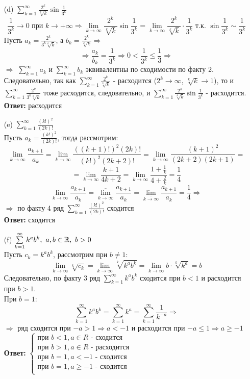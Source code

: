 \documentclass[a4paper]{article}
\renewcommand{\f}[2]{\frac{#1}{#2}}
\newcommand{\s}[2]{\sum\limits_{#1}^{#2}}
\newcommand{\case}[1]{\begin{cases} #1 \end{cases}}
\newcommand{\ts}{\text{\space}}
\renewcommand{\r}{\Rightarrow}
\renewcommand{\geq}{\geqslant}
\renewcommand{\leq}{\leqslant}
\newcommand{\RR}{\mathbb{R}}
\begin{document}
\begin{enumerate}
\begin{enumerate}
        \item[(d)]
        $\s{k=1}{\infty}\f{2^k}{\sqrt[k]{k}}\sin{\f{1}{3^k}}$
        $$\f{1}{3^k} \to 0 \text{ при } k \to +\infty \r \lim_{k\to \infty}\f{2^k}{\sqrt[k]{k}}\sin{\f{1}{3^k}} = \lim_{k\to \infty}\f{2^k}{\sqrt[k]{k}} \cdot  \f{1}{3^k} \text{ т.к. } \sin{\f{1}{3^k}} \sim \f{1}{3^k}  $$
        Пусть $a_k = \f{2^k}{3^k \sqrt[k]{k}}$, а $b_k = \f{2^k}{\sqrt[k]{k}} \r $
        $$\r \f{a_k}{b_k} = \f{1}{3^k}\r 0 <\f{1}{3^k} \leq \f{1}{3} \r $$
        $\r$ $\s{k=1}{\infty}a_k$ и  $\s{k=1}{\infty}b_k$ эквивалентны по сходимости по факту 2.\\
        Следовательно, так как $\s{k=1}{\infty}\f{2^k}{\sqrt[k]{k}}$ - расходится ($2^k \to \infty$, $\sqrt[k]{k} \to 1$), то и $\s{k=1}{\infty}\f{2^k}{3^k \sqrt[k]{k}}$ тоже расходится,
        следовательно, и  $\s{k=1}{\infty}\f{2^k}{\sqrt[k]{k}}\sin{\f{1}{3^k}}$ - расходится.\\
        \textbf{Ответ: } расходится\\

        \item[(e)]$\s{k=1}{\infty}\f{(k!)^2}{(2k)!}$\\
        Пусть $a_k = \f{(k!)^2}{(2k)!}$, тогда рассмотрим:
        $$\lim_{k \to \infty}\f{a_{k+1}}{a_k} = \lim_{k \to \infty}\f{((k+1)!)^2 (2k)!}{(k!)^2 (2k+2)!} = \lim_{k \to \infty}\f{(k+1)^2}{(2k+2)(2k+1)} = $$ 
        $$= \lim_{k \to \infty}\f{k+1}{4k+2} = \lim_{k \to \infty}\f{1+\f{1}{k}}{4+\f{2}{k}} = \f{1}{4}$$
        $$\lim_{k \to \infty}\f{a_{k+1}}{a_k} = \overline{\lim_{k \to \infty}}\f{a_{k+1}}{a_k} = \lim_{\overline{k \to \infty}}\f{a_{k+1}}{a_k} = \f{1}{4} \r$$
        $\r $ по факту 4 ряд $\s{k=1}{\infty}\f{(k!)^2}{(2k)!}$ сходится\\
        \textbf{Ответ: } сходится\\

        \item[(f)]$\s{k=1}{\infty}k^a b^k, \ts a, b \in \RR, \ts b>0$\\
        Пусть $c_k = k^a b^k$, рассмотрим при $b \neq 1$:
        $$\lim_{k \to \infty} \sqrt[k]{c_k} = \lim_{k \to \infty} \sqrt[k]{ k^a b^k} = \lim_{k \to \infty} b \cdot \sqrt[k]{ k^a} =b$$
        Следовательно, по факту 3 ряд $\s{k=1}{\infty}k^a b^k$ сходится при $b<1$ и расходится при $b>1$.\\
        При $b=1$:
        $$\s{k=1}{\infty}k^a b^k = \s{k=1}{\infty}k^a = \s{k=1}{\infty}\f{1}{k^{-a}} \r $$
        $\r $ ряд сходится при $-a > 1 \r a < -1$ и расходится при $-a \leq 1 \r a \geq -1$\\
        \textbf{Ответ: } $\case{
            \text{при $b < 1, a \in R$ - сходится} \\
            \text{при $b > 1, a \in R$ - расходится} \\
            \text{при $b = 1, a < -1 $ - сходится} \\
            \text{при $b = 1, a \geq -1 $ - сходится} \\
        }$\\


\end{enumerate}
\end{enumerate}
\end{document}
